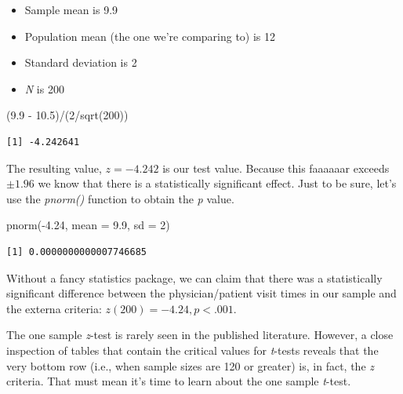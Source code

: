 \documentclass[
  11pt,
]{book}
\newenvironment{Shaded}{\begin{snugshade}}{\end{snugshade}}
\newcommand{\AttributeTok}[1]{\textcolor[rgb]{0.77,0.63,0.00}{#1}}
\newcommand{\DecValTok}[1]{\textcolor[rgb]{0.00,0.00,0.81}{#1}}
\newcommand{\FloatTok}[1]{\textcolor[rgb]{0.00,0.00,0.81}{#1}}
\newcommand{\FunctionTok}[1]{\textcolor[rgb]{0.00,0.00,0.00}{#1}}
\newcommand{\NormalTok}[1]{#1}
\newcommand{\SpecialCharTok}[1]{\textcolor[rgb]{0.00,0.00,0.00}{#1}}
\providecommand{\tightlist}{%
  \setlength{\itemsep}{0pt}\setlength{\parskip}{0pt}}
\begin{document}
\begin{itemize}
\tightlist
\item
  Sample mean is 9.9
\item
  Population mean (the one we're comparing to) is 12
\item
  Standard deviation is 2
\item
  \emph{N} is 200
\end{itemize}

\begin{Shaded}
\begin{Highlighting}[]
\NormalTok{(}\FloatTok{9.9} \SpecialCharTok{{-}} \FloatTok{10.5}\NormalTok{)}\SpecialCharTok{/}\NormalTok{(}\DecValTok{2}\SpecialCharTok{/}\FunctionTok{sqrt}\NormalTok{(}\DecValTok{200}\NormalTok{))}
\end{Highlighting}
\end{Shaded}

\begin{verbatim}
[1] -4.242641
\end{verbatim}

The resulting value, \(z = -4.242\) is our test value. Because this faaaaaar exceeds \(\pm 1.96\) we know that there is a statistically significant effect. Just to be sure, let's use the \emph{pnorm()} function to obtain the \emph{p} value.

\begin{Shaded}
\begin{Highlighting}[]
\FunctionTok{pnorm}\NormalTok{(}\SpecialCharTok{{-}}\FloatTok{4.24}\NormalTok{, }\AttributeTok{mean =} \FloatTok{9.9}\NormalTok{, }\AttributeTok{sd =} \DecValTok{2}\NormalTok{)}
\end{Highlighting}
\end{Shaded}

\begin{verbatim}
[1] 0.0000000000007746685
\end{verbatim}

Without a fancy statistics package, we can claim that there was a statistically significant difference between the physician/patient visit times in our sample and the externa criteria: \(z(200) = -4.24, p < .001\).

The one sample \emph{z}-test is rarely seen in the published literature. However, a close inspection of tables that contain the critical values for \emph{t}-tests reveals that the very bottom row (i.e., when sample sizes are 120 or greater) is, in fact, the \emph{z} criteria. That must mean it's time to learn about the one sample \emph{t}-test.
\end{document}
